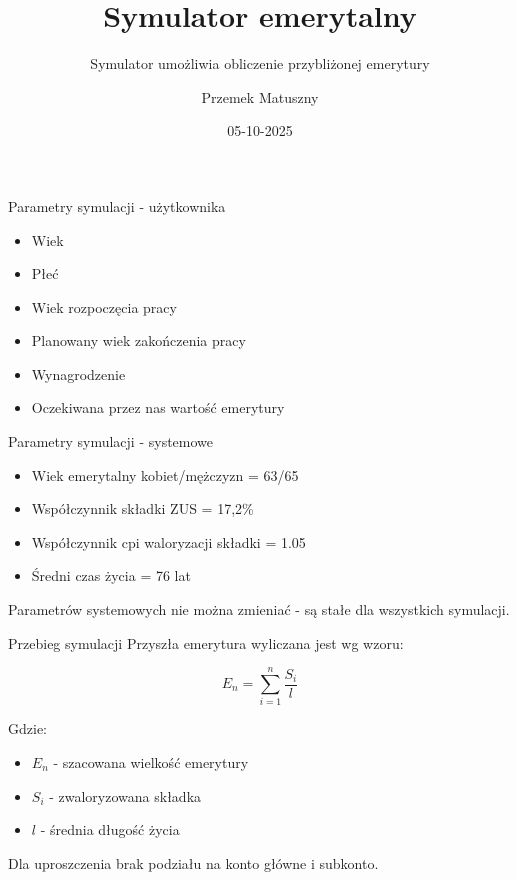 \documentclass{beamer}
\title{Symulator emerytalny}
\subtitle{Symulator umożliwia obliczenie przybliżonej emerytury}
\author{Przemek Matuszny}
\date{05-10-2025}
\institute{Team: PMTS}
\begin{document}
    \maketitle

    \begin{frame}[t]{Parametry symulacji - użytkownika} \vspace{4pt}
        \begin{itemize}
            \item Wiek
            \item Płeć
            \item Wiek rozpoczęcia pracy
            \item Planowany wiek zakończenia pracy
            \item Wynagrodzenie
            \item Oczekiwana przez nas wartość emerytury
        \end{itemize}
    \end{frame}

    \begin{frame}[t]{Parametry symulacji - systemowe} \vspace{4pt}
        \begin{itemize}
            \item Wiek emerytalny kobiet/mężczyzn = 63/65
            \item Współczynnik składki ZUS = 17,2\%
            \item Współczynnik cpi waloryzacji składki = 1.05
            \item Średni czas życia = 76 lat
        \end{itemize}
        Parametrów systemowych nie można zmieniać - są stałe dla wszystkich symulacji.
    \end{frame}

    \begin{frame}[t]{Przebieg symulacji} \vspace{4pt}
        Przyszła emerytura wyliczana jest wg wzoru:

        \begin{equation}
            E_{n} = \sum_{i=1}^{n} \frac{S_i}{l}
        \end{equation}

        Gdzie:
        \begin{itemize}
            \item $ E_{n} $ - szacowana wielkość emerytury
            \item $ S_{i} $ - zwaloryzowana składka
            \item $ l $ - średnia długość życia
        \end{itemize}
        Dla uproszczenia brak podziału na konto główne i subkonto.
    \end{frame}
\end{document}

